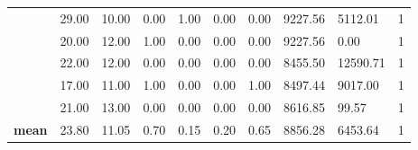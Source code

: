 \begin{table*}[h]
\begin{tabular}{llllllllll}
\multicolumn{1}{l|}{}                   & \multicolumn{1}{l|}{29.00}        & \multicolumn{1}{l|}{10.00}              & \multicolumn{1}{l|}{0.00}           & \multicolumn{1}{l|}{1.00}              & \multicolumn{1}{l|}{0.00}             & \multicolumn{1}{l|}{0.00}              & \multicolumn{1}{l|}{9227.56}       & \multicolumn{1}{l|}{5112.01}       & \multicolumn{1}{l|}{1}          \\ \cline{2-10} 
\multicolumn{1}{l|}{}                   & \multicolumn{1}{l|}{20.00}        & \multicolumn{1}{l|}{12.00}              & \multicolumn{1}{l|}{1.00}           & \multicolumn{1}{l|}{0.00}              & \multicolumn{1}{l|}{0.00}             & \multicolumn{1}{l|}{0.00}              & \multicolumn{1}{l|}{9227.56}       & \multicolumn{1}{l|}{0.00}          & \multicolumn{1}{l|}{1}          \\ \cline{2-10} 
\multicolumn{1}{l|}{}                   & \multicolumn{1}{l|}{22.00}        & \multicolumn{1}{l|}{12.00}              & \multicolumn{1}{l|}{0.00}           & \multicolumn{1}{l|}{0.00}              & \multicolumn{1}{l|}{0.00}             & \multicolumn{1}{l|}{0.00}              & \multicolumn{1}{l|}{8455.50}       & \multicolumn{1}{l|}{12590.71}      & \multicolumn{1}{l|}{1}          \\ \cline{2-10} 
\multicolumn{1}{l|}{}                   & \multicolumn{1}{l|}{17.00}        & \multicolumn{1}{l|}{11.00}              & \multicolumn{1}{l|}{1.00}           & \multicolumn{1}{l|}{0.00}              & \multicolumn{1}{l|}{0.00}             & \multicolumn{1}{l|}{1.00}              & \multicolumn{1}{l|}{8497.44}       & \multicolumn{1}{l|}{9017.00}       & \multicolumn{1}{l|}{1}          \\ \cline{2-10} 
\multicolumn{1}{l|}{}                   & \multicolumn{1}{l|}{21.00}        & \multicolumn{1}{l|}{13.00}              & \multicolumn{1}{l|}{0.00}           & \multicolumn{1}{l|}{0.00}              & \multicolumn{1}{l|}{0.00}             & \multicolumn{1}{l|}{0.00}              & \multicolumn{1}{l|}{8616.85}       & \multicolumn{1}{l|}{99.57}         & \multicolumn{1}{l|}{1}          \\ \hline
\multicolumn{1}{|l|}{\textbf{mean}}     & \multicolumn{1}{l|}{23.80}        & \multicolumn{1}{l|}{11.05}              & \multicolumn{1}{l|}{0.70}           & \multicolumn{1}{l|}{0.15}              & \multicolumn{1}{l|}{0.20}             & \multicolumn{1}{l|}{0.65}              & \multicolumn{1}{l|}{8856.28}       & \multicolumn{1}{l|}{6453.64}       & \multicolumn{1}{l|}{1}          \\ \hline

\end{tabular}
\end{table*}
